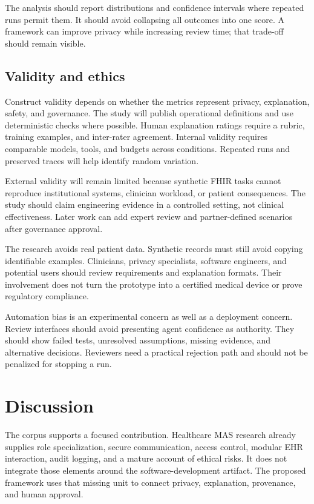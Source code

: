 \documentclass[11pt,a4paper]{article}
\begin{document}
The analysis should report distributions and confidence intervals where repeated runs permit them. It should avoid collapsing all outcomes into one score. A framework can improve privacy while increasing review time; that trade-off should remain visible.

\subsection{Validity and ethics}

Construct validity depends on whether the metrics represent privacy, explanation, safety, and governance. The study will publish operational definitions and use deterministic checks where possible. Human explanation ratings require a rubric, training examples, and inter-rater agreement. Internal validity requires comparable models, tools, and budgets across conditions. Repeated runs and preserved traces will help identify random variation.

External validity will remain limited because synthetic FHIR tasks cannot reproduce institutional systems, clinician workload, or patient consequences. The study should claim engineering evidence in a controlled setting, not clinical effectiveness. Later work can add expert review and partner-defined scenarios after governance approval.

The research avoids real patient data. Synthetic records must still avoid copying identifiable examples. Clinicians, privacy specialists, software engineers, and potential users should review requirements and explanation formats. Their involvement does not turn the prototype into a certified medical device or prove regulatory compliance.

Automation bias is an experimental concern as well as a deployment concern. Review interfaces should avoid presenting agent confidence as authority. They should show failed tests, unresolved assumptions, missing evidence, and alternative decisions. Reviewers need a practical rejection path and should not be penalized for stopping a run.

\section{Discussion}

The corpus supports a focused contribution. Healthcare MAS research already supplies role specialization, secure communication, access control, modular EHR interaction, audit logging, and a mature account of ethical risks. It does not integrate those elements around the software-development artifact. The proposed framework uses that missing unit to connect privacy, explanation, provenance, and human approval.
\end{document}
